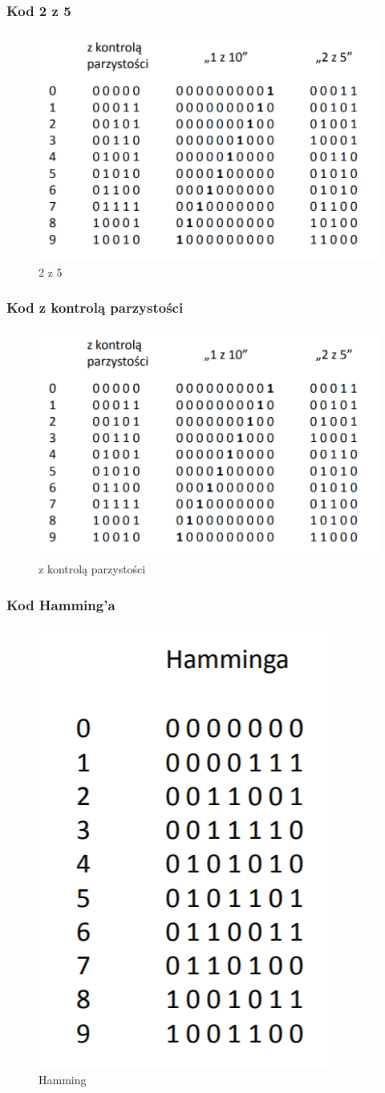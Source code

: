 \subsubsection{Kod 2 z 5}

\begin{figure}[h!]
    \centering
    \includegraphics[width=.5\textwidth]{images/codes/detective.png}
    \caption{2 z 5}
    \label{fig:my_label}
\end{figure}

\subsubsection{Kod z kontrolą parzystości}

\begin{figure}[h!]
    \centering
    \includegraphics[width=.5\textwidth]{images/codes/detective.png}
    \caption{z kontrolą parzystości}
    \label{fig:my_label}
\end{figure}

\newpage

\subsubsection{Kod Hamming'a}

\begin{figure}[h!]
    \centering
    \includegraphics[width=.4\textwidth]{images/codes/hamming.png}
    \caption{Hamming}
    \label{fig:my_label}
\end{figure}